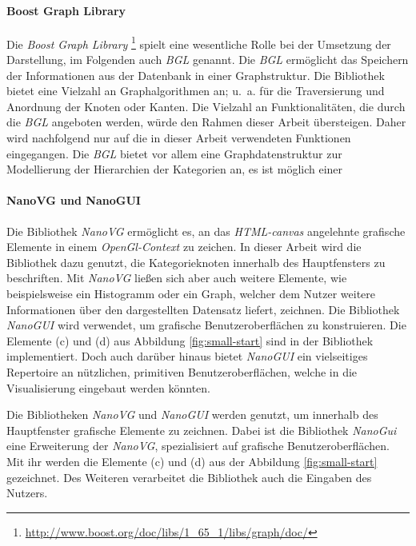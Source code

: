 \paragraph{Boost Graph Library}
Die \emph{Boost Graph Library} \footnote{\url{http://www.boost.org/doc/libs/1_65_1/libs/graph/doc/}} spielt eine wesentliche Rolle bei der Umsetzung der Darstellung, im Folgenden auch \emph{BGL} genannt.
Die \emph{BGL} ermöglicht das Speichern der Informationen aus der Datenbank in einer Graphstruktur.
Die Bibliothek bietet eine Vielzahl an Graphalgorithmen an; u.~a. für die Traversierung und Anordnung der Knoten oder Kanten.
Die Vielzahl an Funktionalitäten, die durch die \emph{BGL} angeboten werden, würde den Rahmen dieser Arbeit übersteigen. Daher wird nachfolgend nur auf die in dieser Arbeit verwendeten Funktionen eingegangen.
Die \emph{BGL} bietet vor allem eine Graphdatenstruktur zur Modellierung der Hierarchien der Kategorien an, es ist möglich einer 



\paragraph{NanoVG und NanoGUI}
Die Bibliothek \emph{NanoVG} ermöglicht es, an das \emph{HTML-canvas} angelehnte grafische Elemente in einem \emph{OpenGl-Context} zu zeichen.
In dieser Arbeit wird die Bibliothek dazu genutzt, die Kategorieknoten innerhalb des Hauptfensters zu beschriften.
Mit \emph{NanoVG} ließen sich aber auch weitere Elemente,  wie beispielsweise ein Histogramm oder ein Graph, welcher dem Nutzer weitere Informationen über den dargestellten Datensatz liefert, zeichnen.
Die Bibliothek \emph{NanoGUI} wird verwendet, um grafische Benutzeroberflächen zu konstruieren.
Die Elemente (c) und (d) aus Abbildung \ref{fig:small-start} sind in der Bibliothek implementiert. Doch auch darüber hinaus bietet \emph{NanoGUI} ein vielseitiges Repertoire an nützlichen, primitiven Benutzeroberflächen, welche in die Visualisierung eingebaut werden könnten.

Die Bibliotheken \emph{NanoVG} und \emph{NanoGUI} werden genutzt, um innerhalb des Hauptfenster grafische Elemente zu zeichnen.
Dabei ist die Bibliothek \emph{NanoGui} eine Erweiterung der \emph{NanoVG}, spezialisiert auf grafische Benutzeroberflächen.
Mit ihr werden die Elemente (c) und (d) aus der Abbildung \ref{fig:small-start} gezeichnet. Des Weiteren verarbeitet die Bibliothek auch die Eingaben des Nutzers.




